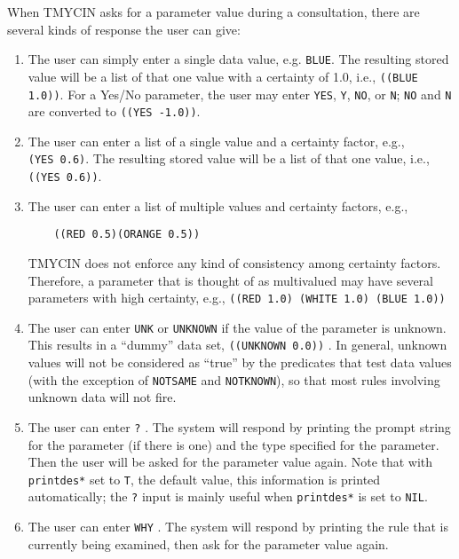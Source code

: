 When TMYCIN asks for a parameter value during a consultation, there are several
kinds of response the user can give:
\begin{enumerate}
\item The user can simply enter a single data value, e.g. {\tt BLUE}.
The resulting stored value will be a list of that one value with a
certainty of 1.0, i.e., {\tt ((BLUE 1.0))}.  For a Yes/No parameter, the
user may enter {\tt YES}, {\tt Y}, {\tt NO}, or {\tt N}; {\tt NO} and
{\tt N} are converted to {\tt ((YES -1.0))}.

\item The user can enter a list of a single value and a certainty factor, e.g.,
{\tt (YES\ 0.6)}.  The resulting stored value will be a list of that one value,
i.e., {\tt ((YES\ 0.6))}.

\item The user can enter a list of multiple values and certainty factors, e.g.,

\begin{verbatim}
    ((RED 0.5)(ORANGE 0.5))
\end{verbatim}

TMYCIN does not enforce any kind of
consistency among certainty factors.  Therefore, a parameter that is thought
of as multivalued may have several parameters with high certainty, e.g.,
{\tt ((RED\ 1.0)\ (WHITE\ 1.0)\ (BLUE\ 1.0))}

\item The user can enter {\tt UNK} or {\tt UNKNOWN} if the value of the
parameter is unknown.  This results in a ``dummy'' data set,
{\tt ((UNKNOWN\ 0.0))} .  In general, unknown values will not be
considered as ``true'' by the predicates that test data values (with the
exception of {\tt NOTSAME} and {\tt NOTKNOWN}), so that most rules
involving unknown data will not fire.

\item The user can enter {\tt ?} .  The system will respond by printing the
prompt string for the parameter (if there is one) and the type specified
for the parameter.  Then the user will be asked for the parameter value again.
Note that with {\tt *printdes*} set to {\tt T}, the default value, this
information is printed automatically; the {\tt ?} input is mainly useful
when {\tt *printdes*} is set to {\tt NIL}.

\item The user can enter {\tt WHY} .  The system will respond by printing the
rule that is currently being examined, then ask for the parameter value again.
\end{enumerate}

